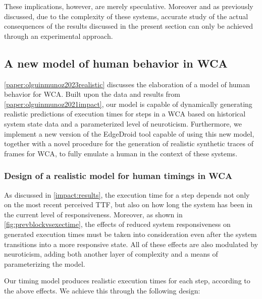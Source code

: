 These implications, however, are merely speculative.
Moreover and as previously discussed, due to the complexity of these systems, accurate study of the actual consequences of the results discussed in the present section can only be achieved through an experimental approach.


\subsection{A new model of human behavior in \acs{WCA}}

\cref{paper:olguinmunoz2023realistic} discusses the elaboration of a model of human behavior for \gls{WCA}.
Built upon the data and results from \cref{paper:olguinmunoz2021impact}, our model is capable of dynamically generating realistic predictions of execution times for steps in a \gls{WCA} based on historical system state data and a parameterized level of neuroticism.
Furthermore, we implement a new version of the EdgeDroid tool capable of using this new model, together with a novel procedure for the generation of realistic synthetic traces of frames for \gls{WCA}, to fully emulate a human in the context of these systems.

\subsubsection{Design of a realistic model for human timings in \gls{WCA}}


As discussed in \cref{impact:results}, the execution time for a step depends not only on the most recent perceived \gls{TTF}, but also on how long the system has been in the current level of responsiveness.
Moreover, as shown in \cref{fig:prevblockvsexectime}, the effects of reduced system responsiveness on generated execution times must be taken into consideration even after the system transitions into a more responsive state.
All of these effects are also modulated by neuroticism, adding both another layer of complexity and a means of parameterizing the model.

Our timing model produces realistic execution times for each step, according to the above effects.
We achieve this through the following design:

